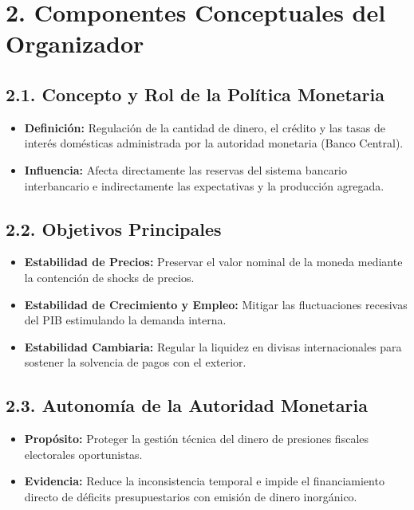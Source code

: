 \documentclass[12pt,spanish]{article}
\providecommand{\tightlist}{%
  \setlength{\itemsep}{0pt}\setlength{\parskip}{0pt}}
\begin{document}
\section{2. Componentes Conceptuales del
Organizador}\label{componentes-conceptuales-del-organizador}

\subsection{2.1. Concepto y Rol de la Política
Monetaria}\label{concepto-y-rol-de-la-poluxedtica-monetaria}

\begin{itemize}
\tightlist
\item
  \textbf{Definición:} Regulación de la cantidad de dinero, el crédito y
  las tasas de interés domésticas administrada por la autoridad
  monetaria (Banco Central).
\item
  \textbf{Influencia:} Afecta directamente las reservas del sistema
  bancario interbancario e indirectamente las expectativas y la
  producción agregada.
\end{itemize}

\subsection{2.2. Objetivos Principales}\label{objetivos-principales}

\begin{itemize}
\tightlist
\item
  \textbf{Estabilidad de Precios:} Preservar el valor nominal de la
  moneda mediante la contención de shocks de precios.
\item
  \textbf{Estabilidad de Crecimiento y Empleo:} Mitigar las
  fluctuaciones recesivas del PIB estimulando la demanda interna.
\item
  \textbf{Estabilidad Cambiaria:} Regular la liquidez en divisas
  internacionales para sostener la solvencia de pagos con el exterior.
\end{itemize}

\subsection{2.3. Autonomía de la Autoridad
Monetaria}\label{autonomuxeda-de-la-autoridad-monetaria}

\begin{itemize}
\tightlist
\item
  \textbf{Propósito:} Proteger la gestión técnica del dinero de
  presiones fiscales electorales oportunistas.
\item
  \textbf{Evidencia:} Reduce la inconsistencia temporal e impide el
  financiamiento directo de déficits presupuestarios con emisión de
  dinero inorgánico.
\end{itemize}
\end{document}

